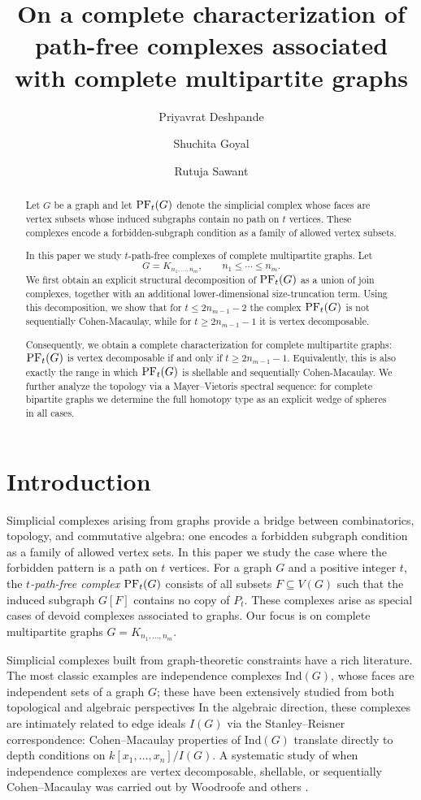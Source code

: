 \documentclass[12pt,reqno]{amsart}
\title[Path-free complexes]{On a complete characterization of  path-free complexes associated with complete multipartite graphs}
\author{Priyavrat Deshpande}
\author{Shuchita Goyal}
\author{Rutuja Sawant}
\theoremstyle{definition}
\newcommand{\PF}{{\rm PF}}
\begin{document}
\begin{abstract}
Let $G$ be a graph and let $\PF_t(G)$ denote the simplicial complex whose faces are
vertex subsets whose induced subgraphs contain no path on $t$ vertices. 
These complexes encode a forbidden-subgraph condition as a family of allowed vertex subsets.


In this paper we study $t$-path-free complexes of complete multipartite graphs.
Let
\[
G=K_{n_1,\dots,n_m}, \qquad n_1\le\cdots\le n_m.
\]
We first obtain an explicit
structural decomposition of $\PF_t(G)$ as a union of join complexes, together with
an additional lower-dimensional size-truncation term. 
Using this decomposition, we show that for $t\le 2n_{m-1}-2$ the complex $\PF_t(G)$ is not sequentially Cohen-Macaulay,
while for $t\ge 2 n_{m-1}-1$ it is vertex decomposable.

Consequently, we obtain a complete characterization for complete multipartite graphs: $\PF_t(G)$ is vertex decomposable if and only if $t\ge 2n_{m-1}-1$. Equivalently, this is also exactly the range in which $\PF_t(G)$ is shellable and sequentially Cohen-Macaulay.
We further analyze the topology via a Mayer–Vietoris spectral sequence: for complete bipartite graphs we determine the full homotopy type as an explicit wedge of spheres in all cases.
\end{abstract}
\maketitle


\section{Introduction}

Simplicial complexes arising from graphs provide a bridge between
combinatorics, topology, and commutative algebra: one encodes a forbidden
subgraph condition as a family of allowed vertex sets. In this paper we study
the case where the forbidden pattern is a path on $t$ vertices. For a graph
$G$ and a positive integer $t$, the \emph{$t$-path-free complex} $\PF_t(G)$
consists of all subsets $F\subseteq V(G)$ such that the induced subgraph
$G[F]$ contains no copy of $P_t$. 
These complexes arise as special cases of devoid complexes \cite{DT} associated to graphs.
Our focus is on complete multipartite graphs $G=K_{n_1,\dots,n_m}$.

Simplicial complexes built from graph-theoretic constraints have a rich literature. 
The most classic examples are independence complexes $\mathrm{Ind}(G)$, whose faces are independent sets of a graph $G$; these have been extensively studied from both topological and algebraic perspectives \cite{RG, Kak}
In the algebraic direction, these complexes are intimately related to edge ideals $I(G)$ via the Stanley–Reisner correspondence: Cohen–Macaulay properties of $\mathrm{Ind}(G)$ translate directly to depth conditions on 
$k[x_1,\dots,x_n]/I(G)$. 
A systematic study of when independence complexes are vertex decomposable, shellable, or sequentially Cohen–Macaulay was carried out by Woodroofe \cite{RW09, RW} and others \cite{FAVT, VanTuylVillarreal2008}. 
\end{document}
